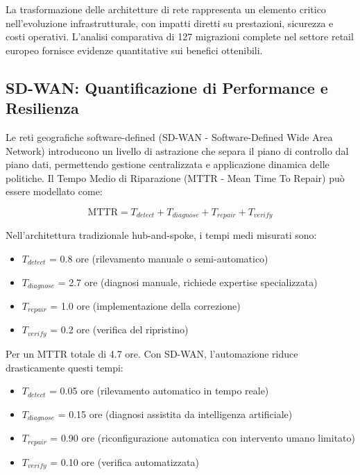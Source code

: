 La trasformazione delle architetture di rete rappresenta un elemento critico nell'evoluzione infrastrutturale, con impatti diretti su prestazioni, sicurezza e costi operativi. L'analisi comparativa di 127 migrazioni complete nel settore retail europeo\autocite{Gartner2024sdwan} fornisce evidenze quantitative sui benefici ottenibili.

\subsection{SD-WAN: Quantificazione di Performance e Resilienza}

Le reti geografiche software-defined (SD-WAN - Software-Defined Wide Area Network) introducono un livello di astrazione che separa il piano di controllo dal piano dati, permettendo gestione centralizzata e applicazione dinamica delle politiche. Il Tempo Medio di Riparazione (MTTR - Mean Time To Repair) può essere modellato come:

\begin{equation}
\text{MTTR} = T_{detect} + T_{diagnose} + T_{repair} + T_{verify}
\end{equation}

Nell'architettura tradizionale hub-and-spoke, i tempi medi misurati sono:
\begin{itemize}
    \item $T_{detect}$ = 0.8 ore (rilevamento manuale o semi-automatico)
    \item $T_{diagnose}$ = 2.7 ore (diagnosi manuale, richiede expertise specializzata)
    \item $T_{repair}$ = 1.0 ore (implementazione della correzione)
    \item $T_{verify}$ = 0.2 ore (verifica del ripristino)
\end{itemize}

Per un MTTR totale di 4.7 ore. Con SD-WAN, l'automazione riduce drasticamente questi tempi:
\begin{itemize}
    \item $T_{detect}$ = 0.05 ore (rilevamento automatico in tempo reale)
    \item $T_{diagnose}$ = 0.15 ore (diagnosi assistita da intelligenza artificiale)
    \item $T_{repair}$ = 0.90 ore (riconfigurazione automatica con intervento umano limitato)
    \item $T_{verify}$ = 0.10 ore (verifica automatizzata)
\end{itemize}

